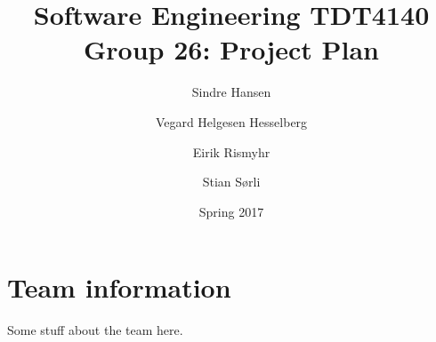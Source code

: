 \documentclass[12pt, a4paper]{article}
\title{Software Engineering TDT4140 \\ Group 26: Project Plan}
\author{Sindre Hansen \and Vegard Helgesen Hesselberg \and Eirik Rismyhr \and Stian Sørli}
\date{Spring 2017}
\begin{document}
\maketitle
\tableofcontents
\newpage

\section{Team information}
Some stuff about the team here.





\newpage

\end{document}
